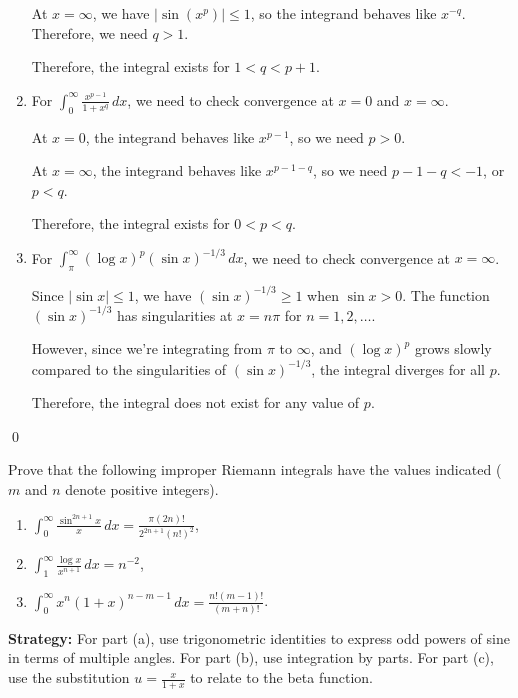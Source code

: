 \begin{enumerate}[label=(\alph*)]
At $x = \infty$, we have $|\sin(x^p)| \leq 1$, so the integrand behaves like $x^{-q}$. Therefore, we need $q > 1$.

Therefore, the integral exists for $1 < q < p + 1$.

\item For $\int_{0}^{\infty} \frac{x^{p-1}}{1 + x^q} \, dx$, we need to check convergence at $x = 0$ and $x = \infty$.

At $x = 0$, the integrand behaves like $x^{p-1}$, so we need $p > 0$.

At $x = \infty$, the integrand behaves like $x^{p-1-q}$, so we need $p - 1 - q < -1$, or $p < q$.

Therefore, the integral exists for $0 < p < q$.

\item For $\int_{\pi}^{\infty} (\log x)^p (\sin x)^{-1/3} \, dx$, we need to check convergence at $x = \infty$.

Since $|\sin x| \leq 1$, we have $(\sin x)^{-1/3} \geq 1$ when $\sin x > 0$. The function $(\sin x)^{-1/3}$ has singularities at $x = n\pi$ for $n = 1, 2, \ldots$.

However, since we're integrating from $\pi$ to $\infty$, and $(\log x)^p$ grows slowly compared to the singularities of $(\sin x)^{-1/3}$, the integral diverges for all $p$.

Therefore, the integral does not exist for any value of $p$.
\end{enumerate}\qed


\begin{problembox}
Prove that the following improper Riemann integrals have the values indicated ($m$ and $n$ denote positive integers).
\begin{enumerate}[label=(\alph*)]
\item $\int_{0}^{\infty} \frac{\sin^{2n+1} x}{x} \, dx = \frac{\pi(2n)!}{2^{2n+1}(n!)^2}$,
\item $\int_{1}^{\infty} \frac{\log x}{x^{n+1}} \, dx = n^{-2}$,
\item $\int_{0}^{\infty} x^n (1 + x)^{n-m-1} \, dx = \frac{n!(m-1)!}{(m+n)!}$.
\end{enumerate}
\end{problembox}

\noindent\textbf{Strategy:} For part (a), use trigonometric identities to express odd powers of sine in terms of multiple angles. For part (b), use integration by parts. For part (c), use the substitution $u = \frac{x}{1+x}$ to relate to the beta function.

